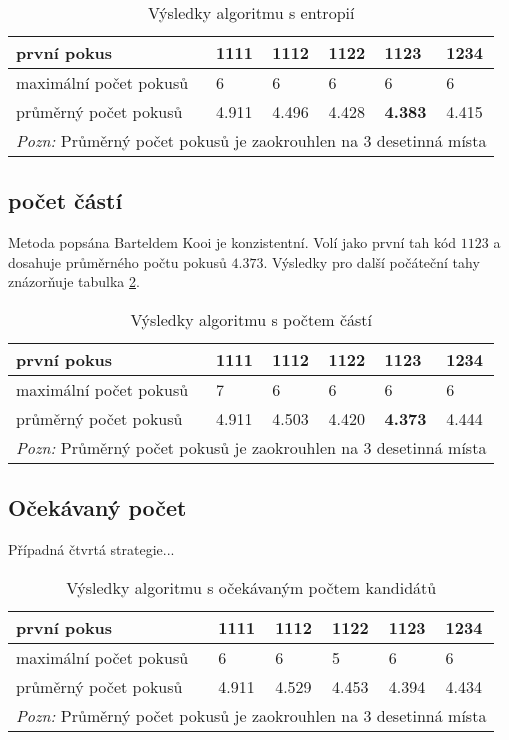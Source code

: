 \begin{table}[h]
\centering
\begin{tabular}{l l l l l l}
\toprule
první pokus & 1111 & 1112 & 1122 & 1123 & \textbf{1234} \\
\midrule

maximální počet pokusů 
& 6 & 6 & 6 & 6 & 6 \\

průměrný počet pokusů 
& 4.911 & 4.496 & 4.428 & \textbf{4.383} & 4.415 \\
\bottomrule
\multicolumn{6}{l}{\footnotesize \textit{Pozn:}
Průměrný počet pokusů je zaokrouhlen na $3$ desetinná místa}
\end{tabular}
\caption{Výsledky algoritmu s entropií}\label{tabentropievysl}
\end{table}



\subsection{počet částí}
Metoda popsána Barteldem Kooi je konzistentní. Volí jako první tah kód $1123$ a dosahuje průměrného počtu pokusů $4.373$. Výsledky pro další počáteční tahy znázorňuje tabulka \ref{tabcastivysl}.


\begin{table}[h]
\centering
\begin{tabular}{l l l l l l}
\toprule
první pokus & 1111 & 1112 & 1122 & \textbf{1123} & 1234 \\
\midrule

maximální počet pokusů 
& 7 & 6 & 6 & 6 & 6 \\

průměrný počet pokusů 
& 4.911 & 4.503 & 4.420 & \textbf{4.373} & 4.444\\
\bottomrule
\multicolumn{6}{l}{\footnotesize \textit{Pozn:}
Průměrný počet pokusů je zaokrouhlen na $3$ desetinná místa}
\end{tabular}
\caption{Výsledky algoritmu s počtem částí}\label{tabcastivysl}
\end{table}


\subsection{Očekávaný počet}
Případná čtvrtá strategie...
\begin{table}[h]
\centering
\begin{tabular}{l l l l l l}
\toprule
první pokus & 1111 & 1112 & 1122 & 1123 & 1234 \\
\midrule

maximální počet pokusů 
& 6 & 6 & 5 & 6 & 6 \\

průměrný počet pokusů 
& 4.911 & 4.529 & 4.453 & 4.394 & 4.434 \\
\bottomrule
\multicolumn{6}{l}{\footnotesize \textit{Pozn:}
Průměrný počet pokusů je zaokrouhlen na $3$ desetinná místa}
\end{tabular}
\caption{Výsledky algoritmu s očekávaným počtem kandidátů}\label{tabminmaxvysl}
\end{table}

